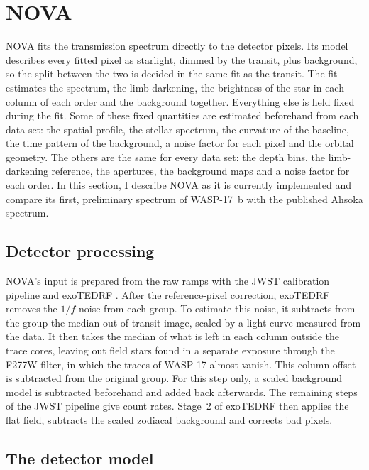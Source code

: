 \section{NOVA}
\label{sec:nova}

NOVA fits the transmission spectrum directly to the detector pixels. Its
model describes every fitted pixel as starlight, dimmed by the transit, plus
background, so the split between the two is decided in the same fit as the
transit. The fit estimates the spectrum, the limb darkening, the brightness of the star in each column of each order and the background together. Everything else is held
fixed during the fit. Some of these fixed quantities are estimated beforehand
from each data set: the spatial profile, the stellar spectrum, the curvature
of the baseline, the time pattern of the background, a noise factor for each
pixel and the orbital geometry. The others are the same for every data set:
the depth bins, the limb-darkening reference, the apertures, the background
maps and a noise factor for each order. In this section, I describe NOVA as it is currently
implemented and compare its first, preliminary spectrum of WASP-17~b with the
published Ahsoka spectrum.

\subsection{Detector processing}
\label{sec:detector-processing}

NOVA's input is prepared from the raw ramps with the JWST calibration pipeline
\citep{JWSTPipeline2025} and exoTEDRF \citep{Radica2024}. After the
reference-pixel correction, exoTEDRF removes the $1/f$ noise from each group.
To estimate this noise, it subtracts from the group the median out-of-transit
image, scaled by a light curve measured from the data. It then takes the median
of what is left in each column outside the trace cores, leaving out field stars
found in a separate exposure through the F277W filter, in which the traces of WASP-17 almost vanish. This column offset is
subtracted from the original group. For this step only, a scaled background
model is subtracted beforehand and added back afterwards. The remaining
steps of the JWST pipeline give count rates. Stage~2 of exoTEDRF then applies
the flat field, subtracts the scaled zodiacal background and corrects bad
pixels.

\subsection{The detector model}
\label{sec:forward}

